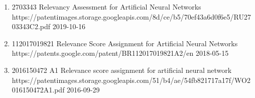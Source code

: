 {{\begin{enumerate}
                \item [] 
                                {2703343}
                                {Relevancy Assessment for Artificial Neural Networks}
                                {https://patentimages.storage.googleapis.com/8d/ce/b5/70ef43a6d0f6e5/RU2703343C2.pdf}
                                {2019-10-16}

                \item [] 
                                {112017019821}
                                {Relevance Score Assignment for Artificial Neural Networks }
                                {https://patents.google.com/patent/BR112017019821A2/en}
                                {2018-05-15}
                                
                \item[] 
                                    {2016150472 A1}
                                    {Relevance score assignment for artificial neural network}
                                    {https://patentimages.storage.googleapis.com/51/b4/ae/54fb821717a17f/WO2016150472A1.pdf}
                                    {2016-09-29}
            \end{enumerate}
        }
    \fi
}

